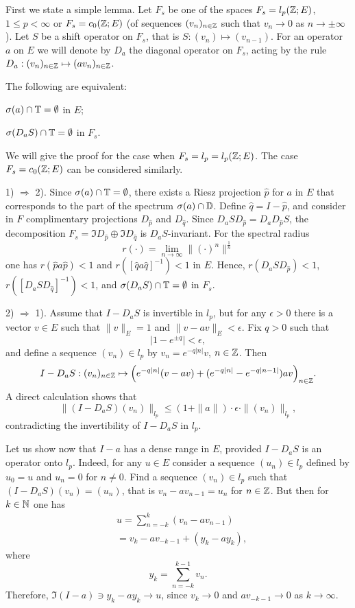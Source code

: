 First we state a simple lemma. Let $F_s$ be one of the spaces
$F_s=l_p({\Bbb{Z}};E)$, $1\leq p<\infty$ or $F_s=c_0({\Bbb{Z}};E)$ (of
sequences $(v_n)_{n\in {\Bbb{Z}}}$ such
that  $v_n\to 0$ as $n\to\pm\infty$). Let $S$ be
a shift operator on $F_s$, that is $S: (v_n)\mapsto (v_{n-1})$.
For an operator $a$ on $E$ we will denote by $D_a$  the
diagonal operator
on $F_s$, acting by the rule
$D_a:(v_n)_{n\in{\Bbb{Z}}} \mapsto (av_n)_{n\in{\Bbb{Z}}}$.


\begin{lem}\label{aS}
The following are equivalent:
\begin{list}{)}{}
\item $\sigma (a) \cap {\Bbb{T}} =\emptyset$ in $E$;
\item $\sigma (D_aS) \cap {\Bbb{T}} =\emptyset$ in $F_s$.
\end{list}
\end{lem}

\begin{pf}
We will give the proof for the case when $F_s = l_p=l_p({\Bbb{Z}};E)$.  The case
$F_s=c_0({\Bbb{Z}};E)$ can be considered similarly.

1) $\Rightarrow$ 2).  Since $\sigma (a) \cap
{\Bbb{T}} =\emptyset$, there exists a Riesz projection ${\hat p}$ for
$a$ in $E$ that corresponds to the part of the spectrum $\sigma
(a) \cap{\Bbb{D}}$. Define ${\hat q}=I-{\hat p}$, and consider in $F$
complimentary projections $D_{\hat p}$ and $D_{\hat q}$. Since
$D_aSD_{\hat p}=D_aD_{\hat p}S$, the decomposition
$F_s=\Im D_{\hat p} \oplus \Im D_{\hat q}$ is
$D_aS$-invariant.
For the
spectral radius
$$r(\cdot)= \lim_{n\to \infty} \|(\cdot )^n\|^{\frac{1}{n}}$$
one has $r({\hat p}a{\hat p})<1$ and $r([{\hat q}a{\hat q}]^{-1})<1$
in $E$. Hence,
$r(D_aSD_{\hat p})<1$, $r([D_aSD_{\hat q}]^{-1})<1$,
and $\sigma (D_aS) \cap {\Bbb{T}} =\emptyset$ in $F_s$.




2) $\Rightarrow$ 1).
Assume that $I-D_aS$ is invertible in $l_p$, but
for any $\epsilon >0$ there is a vector $v\in E$ such that
$\|v\|_E=1$ and $\|v-av\|_E < \epsilon$. Fix $q>0$ such that
$$
\Big| 1-e^{\pm q}\Big|  < \epsilon,
$$
and define a sequence $(v_n)\in l_p$ by $v_n=e^{-q|n|}v$,
$n\in {\Bbb{Z}}$. Then
$$
I-D_aS : (v_n)_{n\in{\Bbb{Z}}}
\mapsto \Big( e^{-q|n|}(v-av) +
(e^{-q|n|}- e^{-q|n-1|})av \Big)_{n\in{\Bbb{Z}}}.
$$
A direct calculation shows that
$$
\|(I-D_aS)(v_n)\|_{l_p}\leq (1+\|a\|) \cdot \epsilon \cdot \|(v_n)\|_{l_p},
$$
contradicting the invertibility of $I-D_aS$ in $l_p$.

Let us show now that $I-a$ has a dense range in $E$,
provided $I-D_aS$ is an operator onto $l_p$. Indeed, for any
$u\in E$ consider a sequence $(u_n)\in l_p$ defined by $u_0=u$ and
$u_n=0$ for $n\neq 0$. Find a sequence $(v_n)\in l_p$ such that
$(I-D_aS)(v_n)=(u_n)$, that is $v_n-av_{n-1}=u_n$ for $n\in {\Bbb{Z}}$.
But then for  $k\in {\Bbb{N}}$ one has
\begin{align*}
& u= \sum_{n=-k}^k(v_n-av_{n-1}) \\
& = v_k -av_{-k-1} + (y_k - ay_k) ,
\end{align*}
where
$$ y_k= \sum_{n=-k}^{k-1}v_n.$$
Therefore, $\Im (I-a) \ni y_k-ay_k\to u$, since
$v_k\to 0$  and $av_{-k-1}\to 0$ as $k\to\infty$.
\end{pf}

